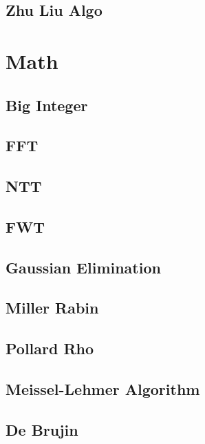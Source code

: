 \documentclass[a4paper,10pt,twocolumn,oneside]{article}
\begin{document}
\subsection{Zhu Liu Algo}


\section{Math}
\subsection{Big Integer}


\subsection{FFT}


\subsection{NTT}


\subsection{FWT}


\subsection{Gaussian Elimination}


\subsection{Miller Rabin}


\subsection{Pollard Rho}


\subsection{Meissel-Lehmer Algorithm}


\subsection{De Brujin}

\end{document}
